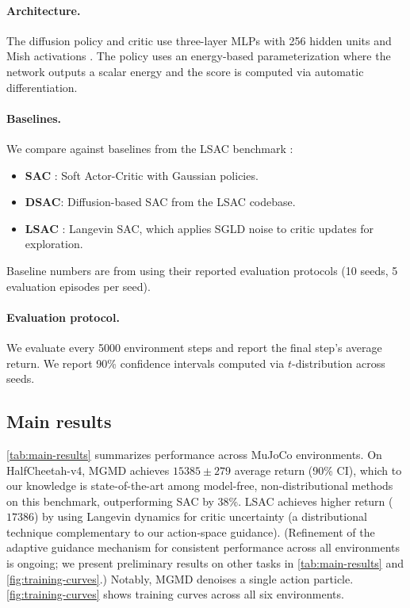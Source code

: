 \documentclass{article}
\theoremstyle{plain}
\theoremstyle{definition}
\theoremstyle{remark}
\begin{document}
\paragraph{Architecture.}
The diffusion policy and critic use three-layer MLPs with 256 hidden units and Mish activations \citep{misra2019mish}.
The policy uses an energy-based parameterization where the network outputs a scalar energy and the score is computed via automatic differentiation.

\paragraph{Baselines.}
We compare against baselines from the LSAC benchmark \citep{lsac2025}:
\begin{itemize}
  \item \textbf{SAC} \citep{haarnoja2018sac}: Soft Actor-Critic with Gaussian policies.
  \item \textbf{DSAC}: Diffusion-based SAC from the LSAC codebase.
  \item \textbf{LSAC} \citep{lsac2025}: Langevin SAC, which applies SGLD noise to critic updates for exploration.
\end{itemize}
Baseline numbers are from \citet{lsac2025} using their reported evaluation protocols (10 seeds, 5 evaluation episodes per seed).

\paragraph{Evaluation protocol.}
We evaluate every 5000 environment steps and report the final step's average return.
We report 90\% confidence intervals computed via $t$-distribution across seeds.

\subsection{Main results}

\cref{tab:main-results} summarizes performance across MuJoCo environments.
On HalfCheetah-v4, MGMD achieves $15385 \pm 279$ average return (90\% CI), which to our knowledge is state-of-the-art among model-free, non-distributional methods on this benchmark, outperforming SAC by 38\%.
LSAC achieves higher return ($17386$) by using Langevin dynamics for critic uncertainty (a distributional technique complementary to our action-space guidance).
(Refinement of the adaptive guidance mechanism for consistent performance across all environments is ongoing; we present preliminary results on other tasks in \cref{tab:main-results} and \cref{fig:training-curves}.)
Notably, MGMD denoises a single action particle.
\cref{fig:training-curves} shows training curves across all six environments.
\end{document}
